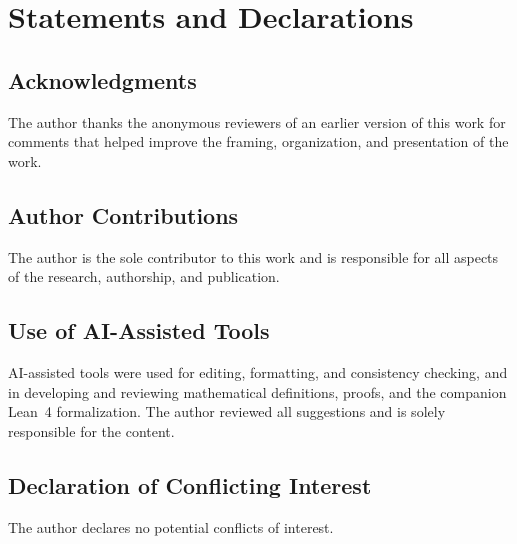 \documentclass[11pt]{article}
\theoremstyle{plain}
\theoremstyle{definition}
\theoremstyle{remark}
\begin{document}
\section*{Statements and Declarations}

\subsection*{Acknowledgments} The author thanks the anonymous reviewers
of an earlier version of this work for comments that helped improve
the framing, organization, and presentation of the work.

\subsection*{Author Contributions}
The author is the sole contributor to this work and
is responsible for all aspects of the research, authorship, and publication.

\subsection*{Use of AI-Assisted Tools}
AI-assisted tools were used for editing, formatting, and consistency checking,
and in developing and reviewing mathematical definitions, proofs,
and the companion Lean~4 formalization.
The author reviewed all suggestions and is solely responsible for the content.

\subsection*{Declaration of Conflicting Interest}
The author declares no potential conflicts of interest.

\appendix
\clearpage

\end{document}
